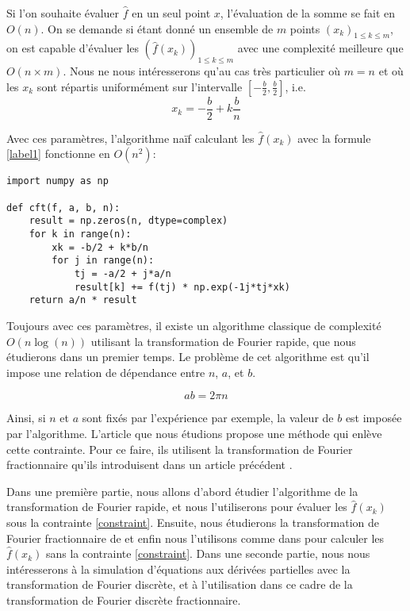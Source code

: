 \documentclass{article}
\begin{document}
Si l'on souhaite évaluer $\hat{f}$ en un seul point $x$, l'évaluation de la somme se fait en $O(n)$.
On se demande si étant donné un ensemble de $m$ points $(x_k)_{1 \le k \le m}$, on est capable d'évaluer les $(\hat{f}(x_k))_{1 \le k \le m}$ avec une complexité meilleure que $O(n \times m)$.
Nous ne nous intéresserons qu'au cas très particulier où $m = n$ et où les $x_k$ sont répartis uniformément sur l'intervalle $[-\frac{b}{2}, \frac{b}{2}]$, i.e. 
$$x_k = -\frac{b}{2} + k \frac{b}{n}$$

Avec ces paramètres, l'algorithme naïf calculant les $\hat{f}(x_k)$ avec la formule \eqref{label1} fonctionne en $O(n^2)$:

\begin{verbatim}
import numpy as np

def cft(f, a, b, n):
    result = np.zeros(n, dtype=complex)
    for k in range(n):
        xk = -b/2 + k*b/n
        for j in range(n):
            tj = -a/2 + j*a/n
            result[k] += f(tj) * np.exp(-1j*tj*xk)
    return a/n * result
\end{verbatim}

Toujours avec ces paramètres, il existe un algorithme classique de complexité $O(n\log(n))$ utilisant la transformation de Fourier rapide, que nous étudierons dans un premier temps.
Le problème de cet algorithme est qu'il impose une relation de dépendance entre $n$, $a$, et $b$.

\begin{equation}
  \label{constraint}
  ab =2 \pi n
\end{equation}

Ainsi, si $n$ et $a$ sont fixés par l'expérience par exemple, la valeur de $b$ est imposée par l'algorithme. 
L'article \cite{FOURINT} que nous étudions propose une méthode qui enlève cette contrainte. 
Pour ce faire, ils utilisent la transformation de Fourier fractionnaire qu'ils introduisent dans un article précédent \cite{FRAC}.


Dans une première partie, nous allons d'abord étudier l'algorithme de la transformation de Fourier rapide, et nous l'utiliserons pour évaluer les $\hat{f}(x_k)$ sous la contrainte \eqref{constraint}.
Ensuite, nous étudierons la transformation de Fourier fractionnaire de \cite{FRAC} et enfin nous l'utilisons comme dans \cite{FOURINT} pour calculer les $\hat{f}(x_k)$ sans la contrainte \eqref{constraint}. Dans une seconde partie, nous nous intéresserons à la simulation d'équations aux dérivées partielles avec la transformation de Fourier discrète, et à l'utilisation dans ce cadre de la transformation de Fourier discrète fractionnaire.
\end{document}
